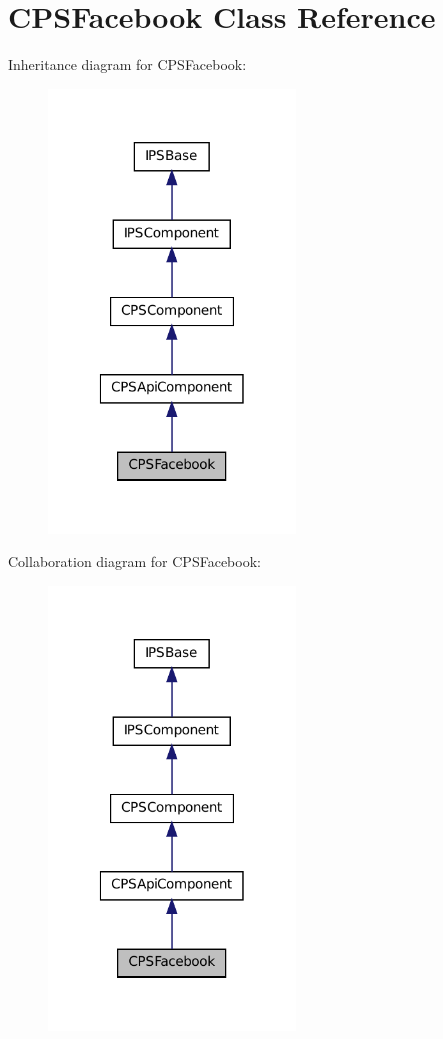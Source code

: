 \hypertarget{classCPSFacebook}{
\section{CPSFacebook Class Reference}
\label{classCPSFacebook}
}


Inheritance diagram for CPSFacebook:\nopagebreak
\begin{figure}[H]
\begin{center}
\leavevmode
\includegraphics[width=186pt]{classCPSFacebook__inherit__graph}
\end{center}
\end{figure}


Collaboration diagram for CPSFacebook:\nopagebreak
\begin{figure}[H]
\begin{center}
\leavevmode
\includegraphics[width=186pt]{classCPSFacebook__coll__graph}
\end{center}
\end{figure}

